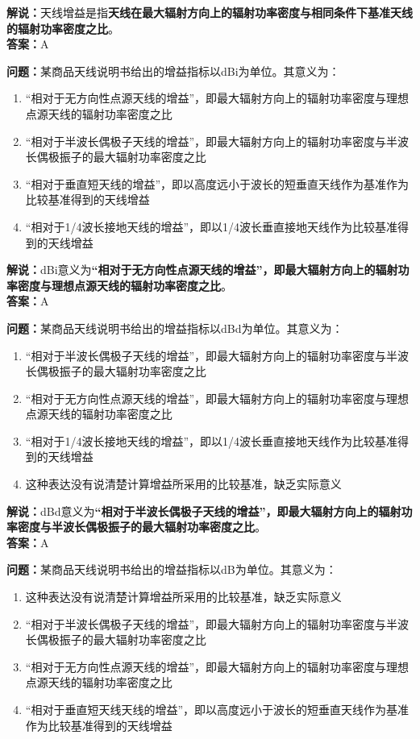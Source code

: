 \textbf{解说：}天线增益是指\textbf{天线在最大辐射方向上的辐射功率密度与相同条件下基准天线的辐射功率密度之比}。\\\textbf{答案：}A



\textbf{问题：}某商品天线说明书给出的增益指标以dBi为单位。其意义为：
\begin{enumerate}[label=\Alph*), leftmargin=1cm]
	\item “相对于无方向性点源天线的增益”，即最大辐射方向上的辐射功率密度与理想点源天线的辐射功率密度之比
	\item “相对于半波长偶极子天线的增益”，即最大辐射方向上的辐射功率密度与半波长偶极振子的最大辐射功率密度之比
	\item “相对于垂直短天线的增益”，即以高度远小于波长的短垂直天线作为基准作为比较基准得到的天线增益
	\item “相对于1/4波长接地天线的增益”，即以1/4波长垂直接地天线作为比较基准得到的天线增益
\end{enumerate}

\textbf{解说：}dBi意义为\textbf{“相对于无方向性点源天线的增益”，即最大辐射方向上的辐射功率密度与理想点源天线的辐射功率密度之比}。\\\textbf{答案：}A



\textbf{问题：}某商品天线说明书给出的增益指标以dBd为单位。其意义为：

\begin{enumerate}[label=\Alph*), leftmargin=1cm]
	\item “相对于半波长偶极子天线的增益”，即最大辐射方向上的辐射功率密度与半波长偶极振子的最大辐射功率密度之比
	\item “相对于无方向性点源天线的增益”，即最大辐射方向上的辐射功率密度与理想点源天线的辐射功率密度之比
	\item “相对于1/4波长接地天线的增益”，即以1/4波长垂直接地天线作为比较基准得到的天线增益
	\item 这种表达没有说清楚计算增益所采用的比较基准，缺乏实际意义
\end{enumerate}

\textbf{解说：}dBd意义为\textbf{“相对于半波长偶极子天线的增益”，即最大辐射方向上的辐射功率密度与半波长偶极振子的最大辐射功率密度之比}。\\\textbf{答案：}A



\textbf{问题：}某商品天线说明书给出的增益指标以dB为单位。其意义为：

\begin{enumerate}[label=\Alph*), leftmargin=1cm]
	\item 这种表达没有说清楚计算增益所采用的比较基准，缺乏实际意义
	\item “相对于半波长偶极子天线的增益”，即最大辐射方向上的辐射功率密度与半波长偶极振子的最大辐射功率密度之比
	\item “相对于无方向性点源天线的增益”，即最大辐射方向上的辐射功率密度与理想点源天线的辐射功率密度之比
	\item “相对于垂直短天线天线的增益”，即以高度远小于波长的短垂直天线作为基准作为比较基准得到的天线增益
\end{enumerate}

